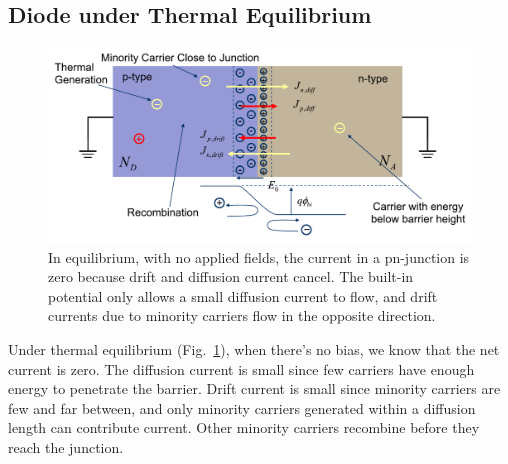 \subsection{Diode under Thermal Equilibrium}
\begin{figure}[tb]
\centering
\includegraphics[width=.75\columnwidth]{slide35}
\caption{In equilibrium, with no applied fields, the current in a pn-junction is zero because drift and diffusion current cancel.  The built-in potential only allows a small diffusion current to flow, and drift currents due to minority carriers flow in the opposite direction.}
\label{fig:slide35}
\end{figure}
Under thermal equilibrium (Fig.~\ref{fig:slide35}), when there's no bias, we know that the net current is zero.  The diffusion current is small since few carriers have enough energy to penetrate the barrier.   Drift current is small since minority carriers are few and far between, and only minority carriers generated within a diffusion length can contribute current.  Other minority carriers recombine before they reach the junction.
